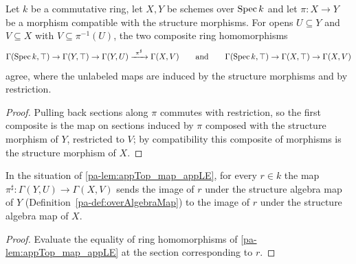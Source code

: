 \begin{lemma}
  \label{pa-lem:appTop_map_appLE}
  \leanok

  Let \(k\) be a commutative ring, let \(X, Y\) be schemes over \(\operatorname{Spec} k\) and let
  \(\pi : X \to Y\) be a morphism compatible with the structure morphisms. For opens
  \(U \subseteq Y\) and \(V \subseteq X\) with \(V \subseteq \pi^{-1}(U)\), the two
  composite ring homomorphisms
  \[
    \Gamma(\operatorname{Spec} k, \top) \to \Gamma(Y, \top) \to \Gamma(Y, U)
      \xrightarrow{\ \pi^\sharp\ } \Gamma(X, V)
    \qquad\text{and}\qquad
    \Gamma(\operatorname{Spec} k, \top) \to \Gamma(X, \top) \to \Gamma(X, V)
  \]
  agree, where the unlabeled maps are induced by the structure morphisms and by
  restriction.
\end{lemma}
\begin{proof}
  \leanok
  Pulling back sections along \(\pi\) commutes with restriction, so the first composite is
  the map on sections induced by \(\pi\) composed with the structure morphism of \(Y\),
  restricted to \(V\); by compatibility this composite of morphisms is the structure
  morphism of \(X\).
\end{proof}

\begin{lemma}
  \label{pa-lem:appLE_overAlgebraMap}
  \leanok

  In the situation of \ref{pa-lem:appTop_map_appLE}, for every \(r \in k\) the map
  \(\pi^\sharp : \Gamma(Y, U) \to \Gamma(X, V)\) sends the image of \(r\) under the
  structure algebra map of \(Y\) (Definition~\ref{pa-def:overAlgebraMap}) to the image of
  \(r\) under the structure algebra map of \(X\).
\end{lemma}
\begin{proof}
  \leanok
  Evaluate the equality of ring homomorphisms of \ref{pa-lem:appTop_map_appLE} at the section
  corresponding to \(r\).
\end{proof}

